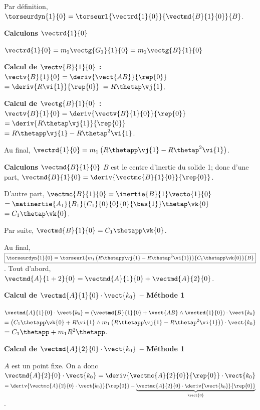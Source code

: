 \begin{corrigebox}
Par définition, $\torseurdyn{1}{0} = \torseurl{\vectrd{1}{0}}{\vectmd{B}{1}{0}}{B}$.

\textbf{Calculons $\vectrd{1}{0}$}

$\vectrd{1}{0} = m_1\vectg{G_1}{1}{0}=m_1 \vectg{B}{1}{0} $

 \textbf{Calcul de $\vectv{B}{1}{0}$ : }  
$\vectv{B}{1}{0}=\deriv{\vect{AB}}{\rep{0}}$ 
$=\deriv{ R\vi{1}}{\rep{0}}$  
$= R\thetap \vj{1}$.

 \textbf{Calcul de $\vectg{B}{1}{0}$ : }  
$\vectv{B}{1}{0}=\deriv{\vectv{B}{1}{0}}{\rep{0}}$ 
$=\deriv{ R\thetap \vj{1}}{\rep{0}}$  
$=  R\thetapp \vj{1}-R\thetap^2 \vi{1}$.

Au final, $\vectrd{1}{0}= m_1\left(R\thetapp \vj{1}-R\thetap^2 \vi{1}\right)$.
\vspace{.5cm}

\textbf{Calculons $\vectmd{B}{1}{0}$}
$B$ est le centre d'inertie du solide 1; donc 
 d'une part, $\vectmd{B}{1}{0} = \deriv{\vectmc{B}{1}{0} }{\rep{0}}$.
 
 D'autre part, $\vectmc{B}{1}{0} = \inertie{B}{1}\vecto{1}{0}$
 $ =\matinertie{A_1}{B_1}{C_1}{0}{0}{0}{\bas{1}} \thetap \vk{0}$
  $ =C_1 \thetap \vk{0}$.
  
  Par suite, $\vectmd{B}{1}{0} = C_1 \thetapp \vk{0}$.
  
  Au final, 
$\boxed{\torseurdyn{1}{0} = \torseurl{m_1\left(R\thetapp \vj{1}-R\thetap^2 \vi{1}\right)}{C_1 \thetapp \vk{0}}{B}}$.
Tout d'abord, $\vectmd{A}{1+2}{0} = \vectmd{A}{1}{0}+\vectmd{A}{2}{0}$.

\textbf{Calcul de $\vectmd{A}{1}{0} \cdot \vect{k_0}$ -- Méthode 1}

$\vectmd{A}{1}{0} \cdot \vect{k_0} = \left(\vectmd{B}{1}{0} + \vect{AB} \wedge \vectrd{1}{0} \right) \cdot \vect{k_0} $
$= \left(C_1 \thetapp \vk{0} + R\vi{1} \wedge m_1\left(R\thetapp \vj{1}-R\thetap^2 \vi{1}\right) \right) \cdot \vect{k_0} $
$= C_1 \thetapp  +  m_1R^2 \thetapp  $.

\textbf{Calcul de $\vectmd{A}{2}{0} \cdot \vect{k_0}$ -- Méthode 1}

$A$ est un point fixe. On a donc 
$\vectmd{A}{2}{0} \cdot \vect{k_0} = \deriv{\vectmc{A}{2}{0}}{\rep{0}}\cdot \vect{k_0} $
$= \deriv{\vectmc{A}{2}{0}\cdot \vect{k_0}}{\rep{0}} - \underbrace{\vectmc{A}{2}{0}\cdot \deriv{ \vect{k_0}}{\rep{0}}}_{\vect{0}}$.


\end{corrigebox}
